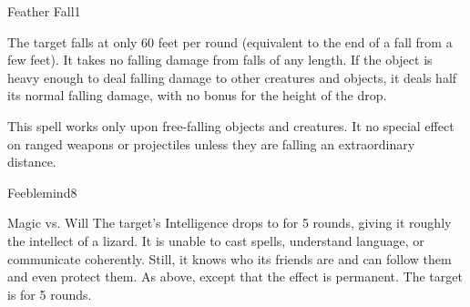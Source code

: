 \begin{spellsection}{Feather Fall}{1}
    \begin{spellheader}
    \end{spellheader}
    \begin{spellcontent}
        \begin{spelltargetinginfo}
        \end{spelltargetinginfo}
        \begin{spelleffects}
            \spelleffect The target falls at only 60 feet per round (equivalent to the end of a fall from a few feet). It takes no falling damage from falls of any length. If the object is heavy enough to deal falling damage to other creatures and objects, it deals half its normal falling damage, with no bonus for the height of the drop.
            \spelldur \durshort
        \end{spelleffects}
    \end{spellcontent}
    \begin{spellfooter}
        \spellnotes This spell works only upon free-falling objects and creatures. It no special effect on ranged weapons or projectiles unless they are falling an extraordinary distance.
        \miscastrandom
    \end{spellfooter}
\end{spellsection}

\begin{spellsection}{Feeblemind}{8}
    \begin{spellheader}
    \end{spellheader}
    \begin{spellcontent}
        \begin{spelltargetinginfo}
        \end{spelltargetinginfo}
        \begin{spelleffects}
            \begin{spellattack}{Magic vs. Will}
                \spellsuccess The target's Intelligence drops to  for 5 rounds, giving it roughly the intellect of a lizard. It is unable to cast spells, understand language, or communicate coherently. Still, it knows who its friends are and can follow them and even protect them.
                \spellcritical As above, except that the effect is permanent.
                \spellfailure The target is \dazed for 5 rounds.
            \end{spellattack}
        \end{spelleffects}
    \end{spellcontent}
    \begin{spellfooter}
        \miscastrandom
    \end{spellfooter}
\end{spellsection}

